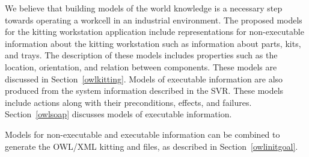 We believe that building models of the world knowledge is a necessary step towards
operating a workcell in an industrial environment. The proposed models
for the kitting workstation application include
representations for non-executable information about the kitting workstation
such as information about parts, kits, and trays. The description of these
models includes properties such as the location, orientation, and relation
between components. These models are discussed in Section~\ref{owlkitting}.
Models of executable information are also produced from the system
information described in the SVR. These models include actions along
with their preconditions, effects, and failures.
Section~\ref{owlsoap} discusses models of executable information.

Models for non-executable and executable information can be
combined to generate the OWL/XML kitting  and 
files, as described in Section~\ref{owlinitgoal}.

